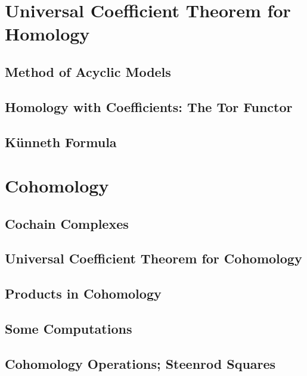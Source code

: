 \documentclass[11pt, a4paper]{article}
\begin{document}
\section{Universal Coefficient Theorem for Homology}

\subsection{Method of Acyclic Models}

\subsection{Homology with Coefficients: The Tor Functor}

\subsection{K\"unneth Formula}

\section{Cohomology}

\subsection{Cochain Complexes}

\subsection{Universal Coefficient Theorem for Cohomology}

\subsection{Products in Cohomology}

\subsection{Some Computations}

\subsection{Cohomology Operations; Steenrod Squares}
\end{document}
